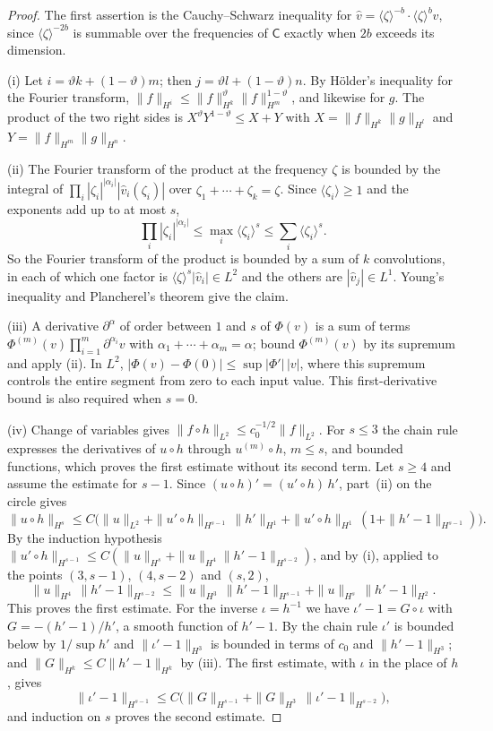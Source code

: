 \begin{proof}
The first assertion is the Cauchy--Schwarz inequality for
$\widehat v=\langle\zeta\rangle^{-b}\cdot\langle\zeta\rangle^b\widehat v$,
since $\langle\zeta\rangle^{-2b}$ is summable over the frequencies of
$\mathsf C$ exactly when $2b$ exceeds its dimension.

(i) Let $i=\vartheta k+(1-\vartheta)m$; then
$j=\vartheta l+(1-\vartheta)n$. By H\"older's inequality for the
Fourier transform,
$\|f\|_{H^i}\le\|f\|_{H^k}^{\vartheta}\|f\|_{H^m}^{1-\vartheta}$, and
likewise for $g$. The product of the two right sides is
$X^\vartheta Y^{1-\vartheta}\le X+Y$ with
$X=\|f\|_{H^k}\|g\|_{H^l}$ and $Y=\|f\|_{H^m}\|g\|_{H^n}$.

(ii) The Fourier transform of the product at the frequency $\zeta$ is
bounded by the integral of
$\prod_i|\zeta_i|^{|\alpha_i|}|\widehat v_i(\zeta_i)|$ over
$\zeta_1+\cdots+\zeta_k=\zeta$. Since
$\langle\zeta_i\rangle\ge1$ and the exponents add up to at most $s$,
\[
 \prod_i|\zeta_i|^{|\alpha_i|}
 \le\max_i\langle\zeta_i\rangle^{s}
 \le\sum_i\langle\zeta_i\rangle^{s}.
\]
So the Fourier transform of the product is bounded by a sum of $k$
convolutions, in each of which one factor is
$\langle\zeta\rangle^s|\widehat v_i|\in L^2$ and the others are
$|\widehat v_j|\in L^1$. Young's inequality and Plancherel's theorem
give the claim.

(iii) A derivative $\partial^\alpha$ of order between $1$ and $s$ of
$\Phi(v)$ is a sum of terms
$\Phi^{(m)}(v)\prod_{i=1}^m\partial^{\alpha_i}v$ with
$\alpha_1+\cdots+\alpha_m=\alpha$; bound $\Phi^{(m)}(v)$ by its
supremum and apply (ii). In $L^2$,
$|\Phi(v)-\Phi(0)|\le\sup|\Phi'|\,|v|$, where this supremum controls
the entire segment from zero to each input value. This first-derivative
bound is also required when $s=0$.

(iv) Change of variables gives
$\|f\circ h\|_{L^2}\le c_0^{-1/2}\|f\|_{L^2}$. For $s\le3$ the chain
rule expresses the derivatives of $u\circ h$ through
$u^{(m)}\circ h$, $m\le s$, and bounded functions, which proves the
first estimate without its second term. Let $s\ge4$ and assume the
estimate for $s-1$. Since $(u\circ h)'=(u'\circ h)\,h'$, part~(ii) on
the circle gives
\[
 \|u\circ h\|_{H^s}
 \le C\bigl(\|u\|_{L^2}+\|u'\circ h\|_{H^{s-1}}\,\|h'\|_{H^1}
 +\|u'\circ h\|_{H^1}\,(1+\|h'-1\|_{H^{s-1}})\bigr).
\]
By the induction hypothesis
$\|u'\circ h\|_{H^{s-1}}\le C(\|u\|_{H^s}+\|u\|_{H^4}\|h'-1\|_{H^{s-2}})$,
and by (i), applied to the points $(3,s-1)$, $(4,s-2)$ and $(s,2)$,
\[
 \|u\|_{H^4}\,\|h'-1\|_{H^{s-2}}
 \le\|u\|_{H^3}\,\|h'-1\|_{H^{s-1}}+\|u\|_{H^s}\,\|h'-1\|_{H^{2}} .
\]
This proves the first estimate. For the inverse $\iota=h^{-1}$ we
have $\iota'-1=G\circ\iota$ with $G=-(h'-1)/h'$, a smooth function of
$h'-1$. By the chain rule $\iota'$ is bounded below by $1/\sup h'$
and $\|\iota'-1\|_{H^3}$ is bounded in terms of $c_0$ and
$\|h'-1\|_{H^3}$; and
$\|G\|_{H^k}\le C\|h'-1\|_{H^k}$ by (iii). The first estimate, with
$\iota$ in the place of $h$, gives
\[
 \|\iota'-1\|_{H^{s-1}}
 \le C\bigl(\|G\|_{H^{s-1}}+\|G\|_{H^3}\,\|\iota'-1\|_{H^{s-2}}\bigr),
\]
and induction on $s$ proves the second estimate.
\end{proof}


